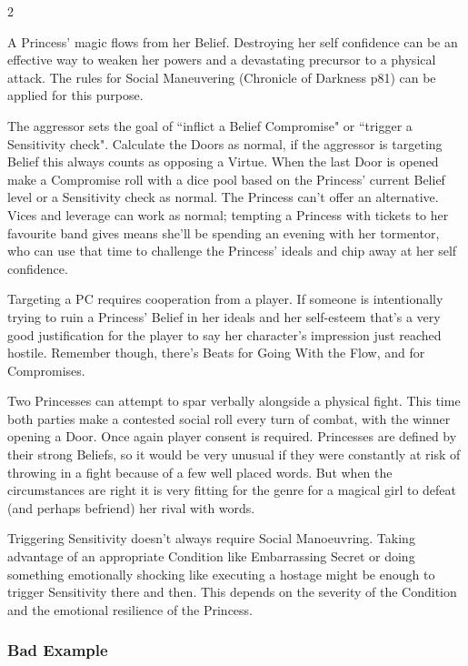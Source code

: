 \begin{multicols}{2}
\begin{mybox}
A Princess' magic flows from her Belief. Destroying her self confidence can be an effective way to weaken her powers and a devastating precursor to a physical attack. The rules for Social Maneuvering (Chronicle of Darkness p81) can be applied for this purpose.

The aggressor sets the goal of \textquotedblleft inflict a Belief Compromise" or \textquotedblleft trigger a Sensitivity check". Calculate the Doors as normal, if the aggressor is targeting Belief this always counts as opposing a Virtue. When the last Door is opened make a Compromise roll with a dice pool based on the Princess' current Belief level or a Sensitivity check as normal. The Princess can't offer an alternative. Vices and leverage can work as normal; tempting a Princess with tickets to her favourite band gives means she'll be spending an evening with her tormentor, who can use that time to challenge the Princess' ideals and chip away at her self confidence. 

Targeting a PC requires cooperation from a player. If someone is intentionally trying to ruin a Princess' Belief in her ideals and her self-esteem that's a very good justification for the player to say her character's impression just reached hostile. Remember though, there's Beats for Going With the Flow, and for Compromises.

Two Princesses can attempt to spar verbally alongside a physical fight. This time both parties make a contested social roll every turn of combat, with the winner opening a Door. Once again player consent is required. Princesses are defined by their strong Beliefs, so it would be very unusual if they were constantly at risk of throwing in a fight because of a few well placed words. But when the circumstances are right it is very fitting for the genre for a magical girl to defeat (and perhaps befriend) her rival with words.

Triggering Sensitivity doesn't always require Social Manoeuvring. Taking advantage of an appropriate Condition like Embarrassing Secret or doing something emotionally shocking like executing a hostage might be enough to trigger Sensitivity there and then. This depends on the severity of the Condition and the emotional resilience of the Princess.

\end{mybox}

\subsubsection*{Bad Example}


\end{multicols}

